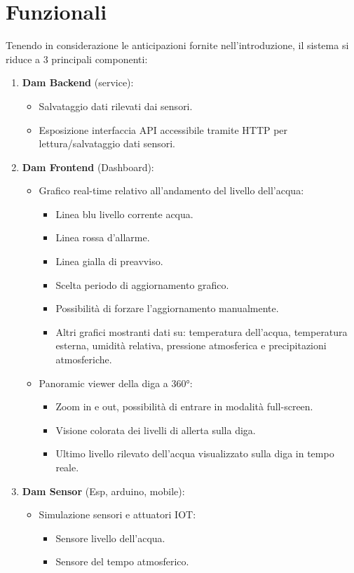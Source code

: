 \documentclass[a4paper,12pt]{report}
\begin{document}
\section{Funzionali}
Tenendo in considerazione le anticipazioni fornite nell'introduzione, il sistema si riduce a 3 principali componenti:
\begin{enumerate}
	\item \textbf{Dam Backend} (service):
	\begin{itemize}
		\item Salvataggio dati rilevati dai sensori.
		\item Esposizione interfaccia API accessibile tramite HTTP per lettura/salvataggio dati sensori.
	\end{itemize} 
	\item \textbf{Dam Frontend} (Dashboard):
	\begin{itemize}
		\item Grafico real-time relativo all'andamento del livello dell'acqua:
		\begin{itemize}
			\item Linea blu livello corrente acqua.
			\item Linea rossa d'allarme.
			\item Linea gialla di preavviso.
			\item Scelta periodo di aggiornamento grafico.
			\item Possibilità di forzare l'aggiornamento manualmente.
			\item Altri grafici mostranti dati su: temperatura dell'acqua, temperatura esterna, umidità relativa, pressione atmosferica e precipitazioni atmosferiche.
		\end{itemize}
		\item Panoramic viewer della diga a 360°:
		\begin{itemize}
			\item Zoom in e out, possibilità di entrare in modalità full-screen.
			\item Visione colorata dei livelli di allerta sulla diga.
			\item Ultimo livello rilevato dell'acqua visualizzato sulla diga in tempo reale.
		\end{itemize}
	\end{itemize}
	\item \textbf{Dam Sensor} (Esp, arduino, mobile):
	\begin{itemize}
		\item Simulazione sensori e attuatori IOT:
		\begin{itemize}
			\item Sensore livello dell'acqua.
			\item Sensore del tempo atmosferico.
		\end{itemize}
	\end{itemize}
\end{enumerate}
\end{document}
